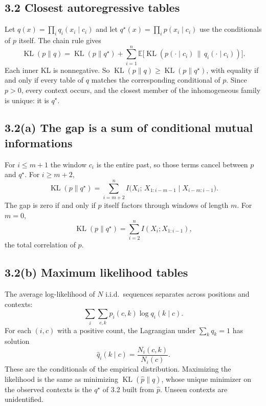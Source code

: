 \documentclass[11pt]{article}
\theoremstyle{remark}
\newcommand{\E}{\mathbb{E}}
\newcommand{\KL}{\operatorname{KL}}
\begin{document}
\subsection*{3.2 Closest autoregressive tables}

Let \(q(x)=\prod_i q_i(x_i\mid c_i)\) and let \(q^\star(x)=\prod_i p(x_i\mid c_i)\) use the conditionals of \(p\) itself. The chain rule gives
\[
\KL(p\|q)
=\KL(p\|q^\star)
+\sum_{i=1}^n\E\big[\KL(p(\cdot\mid c_i)\,\|\,q_i(\cdot\mid c_i))\big].
\]
Each inner KL is nonnegative. So \(\KL(p\|q)\ge\KL(p\|q^\star)\), with equality if and only if every table of \(q\) matches the corresponding conditional of \(p\). Since \(p>0\), every context occurs, and the closest member of the inhomogeneous family is unique: it is \(q^\star\).

\subsection*{3.2(a) The gap is a sum of conditional mutual informations}

For \(i\le m+1\) the window \(c_i\) is the entire past, so those terms cancel between \(p\) and \(q^\star\). For \(i\ge m+2\),
\[
\KL(p\|q^\star)
=\sum_{i=m+2}^{n}I\big(X_i;\,X_{1:i-m-1}\mid X_{i-m:i-1}\big).
\]
The gap is zero if and only if \(p\) itself factors through windows of length \(m\). For \(m=0\),
\[
\KL(p\|q^\star)=\sum_{i=2}^n I(X_i;X_{1:i-1}),
\]
the total correlation of \(p\).

\subsection*{3.2(b) Maximum likelihood tables}

The average log-likelihood of \(N\) i.i.d.\ sequences separates across positions and contexts:
\[
\sum_i\sum_{c,k}\hat p_i(c,k)\log q_i(k\mid c).
\]
For each \((i,c)\) with a positive count, the Lagrangian under \(\sum_k q_k=1\) has solution
\[
\hat q_i(k\mid c)=\frac{N_i(c,k)}{N_i(c)}.
\]
These are the conditionals of the empirical distribution. Maximizing the likelihood is the same as minimizing \(\KL(\hat p\|q)\), whose unique minimizer on the observed contexts is the \(q^\star\) of 3.2 built from \(\hat p\). Unseen contexts are unidentified.
\end{document}
